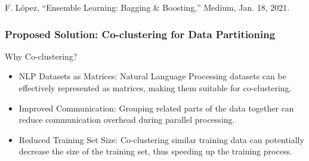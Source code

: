 \documentclass[11pt]{beamer}
\begin{document}
\begin{frame}
    [1] F. López, “Ensemble Learning: Bagging \& Boosting,” Medium, Jan. 18, 2021.


\end{frame}


\begin{frame}
    \frametitle{Proposed Solution: Co-clustering for Data Partitioning}
    \begin{block}{Why Co-clustering?}
        \begin{itemize}
            \item NLP Datasets as Matrices: Natural Language Processing datasets can be effectively represented as matrices, making them suitable for co-clustering.
            \item Improved Communication: Grouping related parts of the data together can reduce communication overhead during parallel processing.
            \item Reduced Training Set Size: Co-clustering similar training data can potentially decrease the size of the training set, thus speeding up the training process.
        \end{itemize}
    \end{block}
\end{frame}
\end{document}

